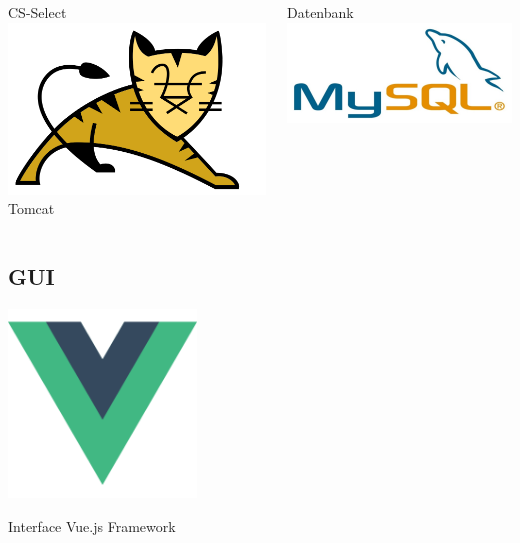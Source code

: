 \documentclass[xcolor=dvipsnames]{beamer}
\begin{document}
\begin{frame}
\begin{columns}
\begin{column}{0.5\textwidth}
\begin{block}{CS-Select}
                \includegraphics[width=(\textwidth) / 2]{img/tomcat.png}
                Tomcat
            \end{block} 
\end{column}
\begin{column}{0.5\textwidth}  %
        \begin{block}{Datenbank}
                \includegraphics[width=\textwidth]{img/MySQL.jpg}
    \end{block}
\end{column}
\end{columns}
\end{frame}
\subsection{GUI}
\begin{frame}
        \includegraphics[width=5cm]{img/vue.png}
        \begin{block}{Interface}
        Vue.js Framework
        \end{block}
\end{frame}
\end{document}
